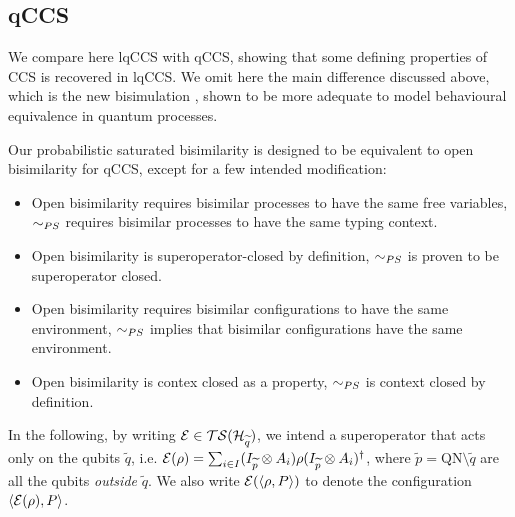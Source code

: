 \subsection{qCCS}
We compare here lqCCS with qCCS, showing that some defining properties of CCS is recovered in lqCCS. We omit here the main difference discussed above, which is the new bisimulation \simqs, shown to be more adequate to model behavioural equivalence in quantum processes.

Our probabilistic saturated bisimilarity is designed to be equivalent to open bisimilarity for qCCS, except for a few intended modification:\begin{itemize}
\item Open bisimilarity requires bisimilar processes to have the same free variables, $\sim_{PS}$ requires bisimilar processes to have the same typing context.
\item Open bisimilarity is superoperator-closed by definition, $\sim_{PS}$ is proven to be superoperator closed.
\item Open bisimilarity requires bisimilar configurations to have the same environment, $\sim_{PS}$ implies that bisimilar configurations have the same environment.
\item Open bisimilarity is contex closed as a property, $\sim_{PS}$ is context closed by definition.
\end{itemize}


In the following, by writing $\mathcal{E} \in \mathcal{TS}(\mathcal{H}_{\widetilde{q}})$, we intend a superoperator that acts only on the qubits $\widetilde{q}$, i.e. $\mathcal{E}(\rho) = \sum_{i \in I} (I_{\widetilde{p}} \otimes A_i) \rho (I_{\widetilde{p}} \otimes A_i)^{\dagger}$, where $\widetilde{p} = \text{QN} \setminus \widetilde{q}$ are all the qubits \textit{outside} $\widetilde{q}$. We also write $\mathcal{E}(\langle\rho, P\rangle)$ to denote the configuration $\langle\mathcal{E}(\rho), P\rangle$.

